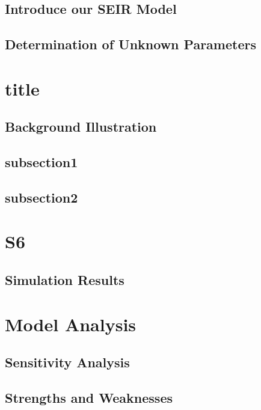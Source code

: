 \documentclass{mcmthesis}
\begin{document}
\subsection{Introduce our SEIR Model}\label{S4s1}
	

\subsection{Determination of Unknown Parameters}\label{S4s2}
	
	


\section{title}\label{S5}

\subsection{Background Illustration}
   
    
\subsection{subsection1}\label{S5s1}
    

\subsection{subsection2}\label{S5s2}
	
 
\section{S6}\label{S6}
   
	
\subsection{Simulation Results}
    


\section{Model Analysis}\label{S7}

\subsection{Sensitivity Analysis}


\subsection{Strengths and Weaknesses}
\end{document}
